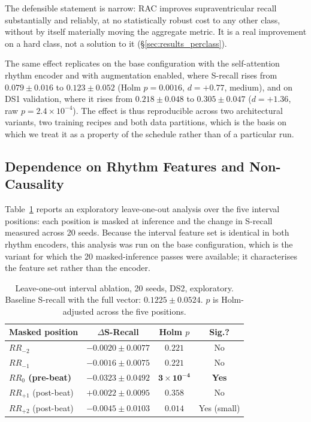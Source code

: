\documentclass[journal,twoside,web]{ieeecolor}
\begin{document}
The defensible statement is narrow: RAC improves supraventricular recall substantially and reliably, at no statistically robust cost to any other class, without by itself materially moving the aggregate metric. It is a real improvement on a hard class, not a solution to it (\S\ref{sec:results_perclass}).

The same effect replicates on the base configuration with the self-attention rhythm encoder and with augmentation enabled, where S-recall rises from $0.079\pm0.016$ to $0.123\pm0.052$ (Holm $p=0.0016$, $d=+0.77$, medium), and on DS1 validation, where it rises from $0.218\pm0.048$ to $0.305\pm0.047$ ($d=+1.36$, raw $p=2.4\times10^{-4}$). The effect is thus reproducible across two architectural variants, two training recipes and both data partitions, which is the basis on which we treat it as a property of the schedule rather than of a particular run.

\subsection{Dependence on Rhythm Features and Non-Causality}
\label{sec:results_rr}
Table~\ref{tab:rr_ablation} reports an exploratory leave-one-out analysis over the five interval positions: each position is masked at inference and the change in S-recall measured across 20 seeds. Because the interval feature set is identical in both rhythm encoders, this analysis was run on the base configuration, which is the variant for which the 20 masked-inference passes were available; it characterises the feature set rather than the encoder.

\begin{table}[!t]
\centering
\caption{Leave-one-out interval ablation, 20 seeds, DS2, exploratory. Baseline S-recall with the full vector: $0.1225\pm0.0524$. $p$ is Holm-adjusted across the five positions.}
\label{tab:rr_ablation}
\begin{tabular}{l c c c}
\toprule
\textbf{Masked position} & \textbf{$\Delta$S-Recall} & \textbf{Holm $p$} & \textbf{Sig.?} \\ \midrule
$RR_{-2}$ & $-0.0020\pm0.0077$ & $0.221$ & No \\
$RR_{-1}$ & $-0.0016\pm0.0075$ & $0.221$ & No \\
\textbf{$RR_{0}$ (pre-beat)} & $\mathbf{-0.0323\pm0.0492}$ & $\mathbf{3\times10^{-4}}$ & \textbf{Yes} \\
$RR_{+1}$ (post-beat) & $+0.0022\pm0.0095$ & $0.358$ & No \\
$RR_{+2}$ (post-beat) & $-0.0045\pm0.0103$ & $0.014$ & Yes (small) \\ \bottomrule
\end{tabular}
\end{table}
\end{document}
